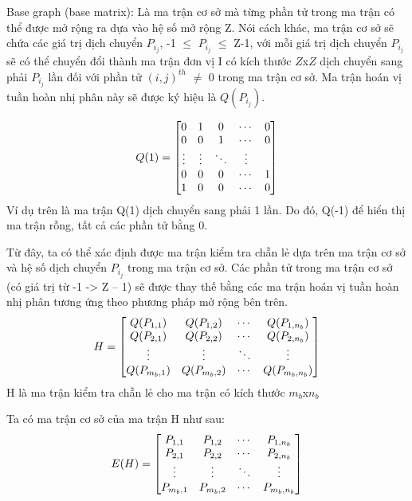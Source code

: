 \documentclass{article}
\begin{document}
Base graph (base matrix): Là ma trận cơ sở mà từng phần tử trong ma trận có thể được mở rộng ra dựa vào hệ số mở rộng Z. Nói cách khác, ma trận cơ sở sẽ chứa các giá trị dịch chuyển $P_{i_j}$, -1 $\le$ $P_{i_j}$ $\le$ Z-1, với mỗi giá trị dịch chuyển $P_{i_j}$ sẽ có thể chuyển đổi thành ma trận đơn vị I có kích thước $Z$x$Z$ dịch chuyển sang phải $P_{i_j}$ lần  đối với phần tử $(i,j)^{th}$ $\ne$ 0 trong ma trận cơ sở. Ma trận hoán vị tuần hoàn nhị phân này sẽ được ký hiệu là $ Q(P_{i_j})$.

\begin{equation*}
\setcounter{MaxMatrixCols}{20}
Q(1) = 
\begin{bmatrix}
0 & 1 & 0 & \cdots & 0 \\
0 & 0 & 1 & \cdots & 0 \\
\vdots  & \vdots  & \ddots & \vdots  \\
0 & 0 & 0 & \cdots & 1 \\ 
1 & 0 & 0 & \cdots & 0 \\ 
\end{bmatrix}
\end{equation*}
Ví dụ trên là ma trận Q(1) dịch chuyển sang phải 1 lần. Do đó, Q(-1) để hiển thị ma trận rỗng, tất cả các phần tử bằng 0.

Từ đây, ta có thể xác định được ma trận kiểm tra chẵn lẻ dựa trên ma trận cơ sở và hệ số dịch chuyển $P_{i_j}$ trong ma trận cơ sở. Các phần tử trong ma trận cơ sở (có giá trị từ -1 ->  Z – 1) sẽ được thay thế bằng các ma trận hoán vị tuần hoàn nhị phân tương ứng theo phương pháp mở rộng bên trên.
\begin{equation*}
\setcounter{MaxMatrixCols}{20}
H = 
\begin{bmatrix}
$$Q(P_{1,1})$$ & $$Q(P_{1,2})$$ & \cdots & $$Q(P_{1,n_b})$$ \\
$$Q(P_{2,1})$$ & $$Q(P_{2,2})$$ & \cdots & $$Q(P_{2,n_b})$$\\
\vdots  & \vdots  & \ddots & \vdots  \\
$$Q(P_{m_b,1})$$ & $$Q(P_{m_b, 2})$$ & \cdots & $$Q(P_{m_b,n_b})$$ \\ 
\end{bmatrix}
\end{equation*}
H là ma trận kiểm tra chẵn lẻ cho ma trận có kích thước $m_b$x$n_b$

Ta có ma trận cơ sở của ma trận H như sau:
\begin{equation*}
\setcounter{MaxMatrixCols}{20}
E(H) = 
\begin{bmatrix}
$$P_{1,1}$$ & $$P_{1,2}$$ & \cdots & $$P_{1,n_b}$$ \\
$$P_{2,1}$$ & $$P_{2,2}$$ & \cdots & $$P_{2,n_b}$$ \\
\vdots  & \vdots  & \ddots & \vdots  \\
$$P_{m_b,1}$$ & $$P_{m_b, 2}$$ & \cdots & $$P_{m_b,n_b}$$ \\ 
\end{bmatrix}
\end{equation*}
\end{document}

